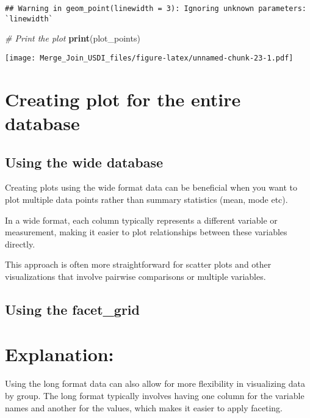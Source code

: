 \documentclass[
]{article}
\newenvironment{Shaded}{\begin{snugshade}}{\end{snugshade}}
\newcommand{\CommentTok}[1]{\textcolor[rgb]{0.56,0.35,0.01}{\textit{#1}}}
\newcommand{\FunctionTok}[1]{\textcolor[rgb]{0.13,0.29,0.53}{\textbf{#1}}}
\newcommand{\NormalTok}[1]{#1}
\begin{document}
\begin{verbatim}
## Warning in geom_point(linewidth = 3): Ignoring unknown parameters: `linewidth`
\end{verbatim}

\begin{Shaded}
\begin{Highlighting}[]
\CommentTok{\# Print the plot}
\FunctionTok{print}\NormalTok{(plot\_points)}
\end{Highlighting}
\end{Shaded}

\texttt{[image: Merge\_Join\_USDI\_files/figure-latex/unnamed-chunk-23-1.pdf]}

\hypertarget{creating-plot-for-the-entire-database}{%
\section{Creating plot for the entire
database}\label{creating-plot-for-the-entire-database}}

\hypertarget{using-the-wide-database}{%
\subsection{Using the wide database}\label{using-the-wide-database}}

Creating plots using the wide format data can be beneficial when you
want to plot multiple data points rather than summary statistics (mean,
mode etc).

In a wide format, each column typically represents a different variable
or measurement, making it easier to plot relationships between these
variables directly.

This approach is often more straightforward for scatter plots and other
visualizations that involve pairwise comparisons or multiple variables.

\hypertarget{using-the-facet_grid}{%
\subsection{Using the facet\_grid}\label{using-the-facet_grid}}

\hypertarget{explanation}{%
\section{Explanation:}\label{explanation}}

Using the long format data can also allow for more flexibility in
visualizing data by group. The long format typically involves having one
column for the variable names and another for the values, which makes it
easier to apply faceting.
\end{document}
